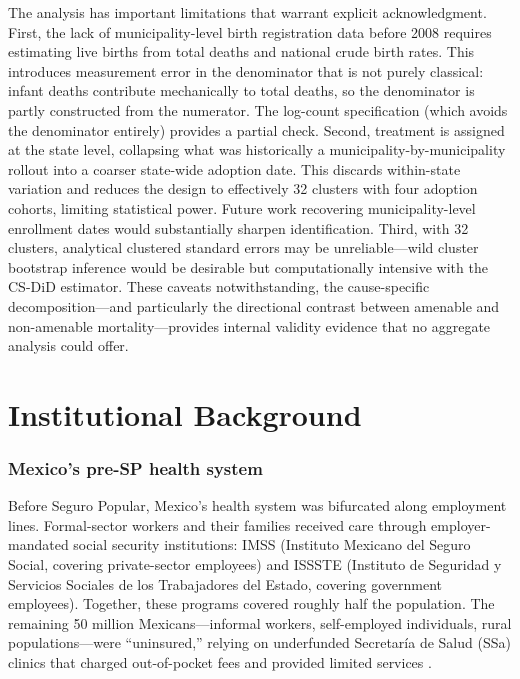 \documentclass[12pt]{article}
\begin{document}
The analysis has important limitations that warrant explicit acknowledgment. First, the lack of municipality-level birth registration data before 2008 requires estimating live births from total deaths and national crude birth rates. This introduces measurement error in the denominator that is not purely classical: infant deaths contribute mechanically to total deaths, so the denominator is partly constructed from the numerator. The log-count specification (which avoids the denominator entirely) provides a partial check. Second, treatment is assigned at the state level, collapsing what was historically a municipality-by-municipality rollout into a coarser state-wide adoption date. This discards within-state variation and reduces the design to effectively 32 clusters with four adoption cohorts, limiting statistical power. Future work recovering municipality-level enrollment dates would substantially sharpen identification. Third, with 32 clusters, analytical clustered standard errors may be unreliable---wild cluster bootstrap inference would be desirable but computationally intensive with the CS-DiD estimator. These caveats notwithstanding, the cause-specific decomposition---and particularly the directional contrast between amenable and non-amenable mortality---provides internal validity evidence that no aggregate analysis could offer.

\section{Institutional Background}

\subsubsection*{Mexico's pre-SP health system} Before Seguro Popular, Mexico's health system was bifurcated along employment lines. Formal-sector workers and their families received care through employer-mandated social security institutions: IMSS (Instituto Mexicano del Seguro Social, covering private-sector employees) and ISSSTE (Instituto de Seguridad y Servicios Sociales de los Trabajadores del Estado, covering government employees). Together, these programs covered roughly half the population. The remaining 50 million Mexicans---informal workers, self-employed individuals, rural populations---were ``uninsured,'' relying on underfunded Secretar\'{i}a de Salud (SSa) clinics that charged out-of-pocket fees and provided limited services \citep{frenk2006}.
\end{document}

